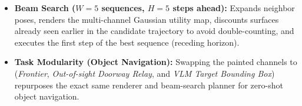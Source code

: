 \documentclass[10pt, a4paper]{article}
\begin{document}
\begin{itemize}
\begin{itemize}
        \item \textbf{Beam Search ($W=5$ sequences, $H=5$ steps ahead):} Expands neighbor poses, renders the multi-channel Gaussian utility map, discounts surfaces already seen earlier in the candidate trajectory to avoid double-counting, and executes the first step of the best sequence (receding horizon).
        \item \textbf{Task Modularity (Object Navigation):} Swapping the painted channels to (\emph{Frontier}, \emph{Out-of-sight Doorway Relay}, and \emph{VLM Target Bounding Box}) repurposes the exact same renderer and beam-search planner for zero-shot object navigation.
    \end{itemize}
\end{itemize}
\end{document}
